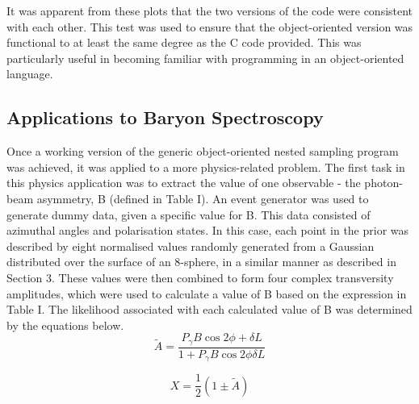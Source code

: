 \documentclass[a4paper,12pt]{article}
\begin{document}
It was apparent from these plots that the two versions of the code were consistent with each other.  This test was used to ensure that the object-oriented version was functional to at least the same degree as the C code provided.  This was particularly useful in becoming familiar with programming in an object-oriented language.


 
\subsection{Applications to Baryon Spectroscopy}

Once a working version of the generic object-oriented nested sampling program was achieved, it was applied to a more physics-related problem.  The first task in this physics application was to extract the value of one observable - the photon-beam asymmetry, B (defined in Table I). An event generator was used to generate dummy data, given a specific value for B.  This data consisted of azimuthal angles and polarisation states.
\newline
In this case, each point in the prior was described by eight normalised values randomly generated from a Gaussian distributed over the surface of an 8-sphere, in a similar manner as described in Section 3. %
These values were then combined to form four complex transversity amplitudes, which were used to calculate a value of B based on the expression in Table I.  The likelihood associated with each calculated value of B was determined by the equations below.
\begin{equation}
 \tilde{A} = \frac{P_{\gamma}B\cos2\phi + \delta L}{1 + P_{\gamma}B\cos2\phi \delta L}
\end{equation}


\begin{equation}
X = \frac{1}{2}(1 \pm \tilde{A})
\end{equation}
\end{document}
